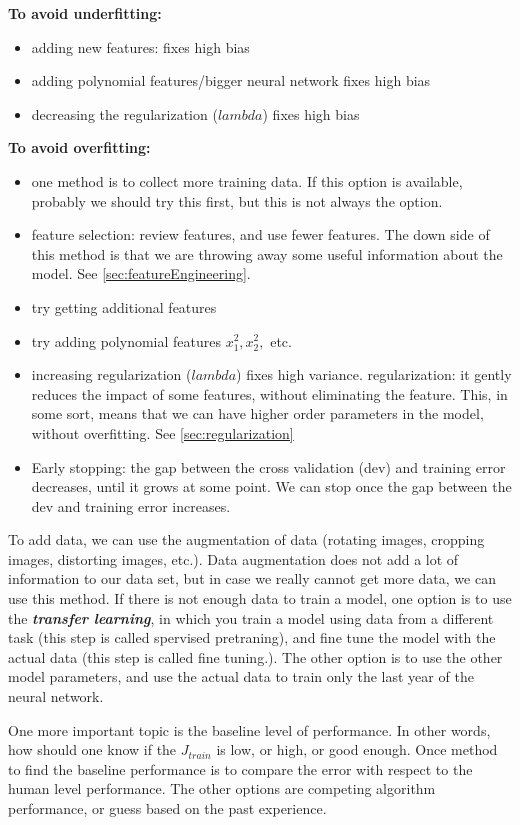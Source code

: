\documentclass[12pt]{report}
\begin{document}
\textbf{To avoid underfitting:}
\begin{itemize}
\item adding new features: fixes high bias
\item adding polynomial features/bigger neural network fixes high bias
\item decreasing the regularization ($lambda$) fixes high bias
\end{itemize}

\textbf{To avoid overfitting:}
\begin{itemize}
\item one method is to collect more training data. If this option is available, probably we should try this first, but this is not always the option.
\item feature selection: review features, and use fewer features. The down side of this method is that we are throwing away some useful information about the model. See \ref{sec:featureEngineering}.
\item try getting additional features
\item try adding polynomial features $x_1^2, x_2^2, $ etc.
\item increasing regularization ($lambda$) fixes high variance. regularization: it gently reduces the impact of some features, without eliminating the feature. This, in some sort, means that we can have higher order parameters in the model, without overfitting. See \ref{sec:regularization}
\item Early stopping: the gap between the cross validation (dev) and training error decreases, until it grows at some point. We can stop once the gap between the dev and training error increases.
\end{itemize}


To add data, we can use the augmentation of data (rotating images, cropping images, distorting images, etc.). Data augmentation does not add a lot of information to our data set, but in case we really cannot get more data, we can use this method.  If there is not enough data to train a model, one option is to use the \textbf{\textit{transfer learning}}, in which you train a model using data from a different task (this step is called spervised pretraning), and fine tune the model with the actual data (this step is called fine tuning.). The other option is to use the other model parameters, and use the actual data to train only the last year of the neural network.

One more important topic is the baseline level of performance. In other words, how should one know if the $J_{train}$ is low, or high, or good enough. Once method to find the baseline performance is to compare the error with respect to the human level performance. The other options are competing algorithm performance, or guess based on the past experience.
\end{document}
